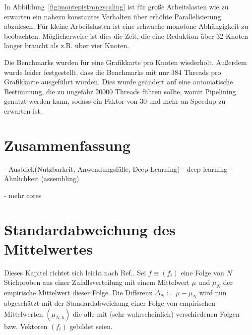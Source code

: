 \documentclass[german,bibnum,beleg,zihtitle,german,hyperref,utf8]{zihpub}
\begin{document}
In Abbildung~\ref{fig:montepistrongscaling} ist für große Arbeitslasten wie zu erwarten ein nahezu konstantes Verhalten über erhöhte Parallelisierung abzulesen. Für kleine Arbeitslasten ist eine schwache monotone Abhängigkeit zu beobachten. Möglicherweise ist dies die Zeit, die eine Reduktion über 32 Knoten länger braucht als z.B. über vier Knoten.

Die Benchmarks wurden für eine Grafikkarte pro Knoten wiederholt. Außerdem wurde leider festgestellt, dass die Benchmarks mit nur 384 Threads pro Grafikkarte ausgeführt wurden. Dies wurde geändert auf eine automatische Bestimmung, die zu ungefähr 20000 Threads führen sollte, womit Pipelining genutzt werden kann, sodass ein Faktor von 30 und mehr an Speedup zu erwarten ist.

\chapter{Zusammenfassung}

 - Ausblick(Nutzbarkeit, Anwendungsfälle, Deep Learning)
 - deep learning - Ähnlichkeit (assembling)

 - mehr cores

\appendix

\chapter{Standardabweichung des Mittelwertes}
\label{apx:meanerror}

Dieses Kapitel richtet sich leicht nach Ref.\cite{meanerrorulm}. Sei $f\equiv(f_i)$ eine Folge von $N$ Stichproben aus einer Zufallsverteilung mit einem Mittelwert $\mu$ und $\mu_N$ der empirische Mittelwert dieser Folge. Die Differenz $\Delta_N:=\mu-\mu_N$ wird nun abgeschätzt mit der Standardabweichung einer Folge von empirischen Mittelwerten $\left(\mu_{N,k}\right)$ die alle mit (sehr wahrscheinlich) verschiedenen Folgen bzw. Vektoren $(f_i)$ gebildet seien.
\end{document}
